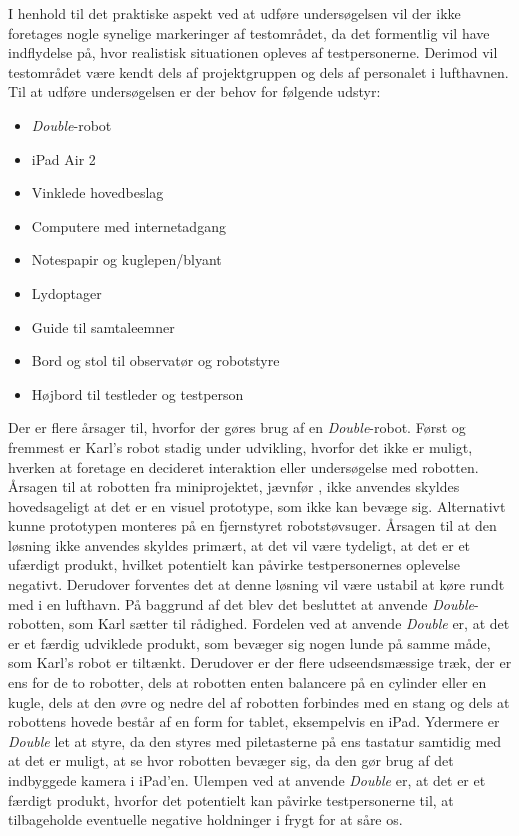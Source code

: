 I henhold til det praktiske aspekt ved at udføre undersøgelsen vil der ikke foretages nogle synelige markeringer af testområdet, da det formentlig vil have indflydelse på, hvor realistisk situationen opleves af testpersonerne. Derimod vil testområdet være kendt dels af projektgruppen og dels af personalet i lufthavnen. \blankline
%
Til at udføre undersøgelsen er der behov for følgende udstyr:\blankline
%
\begin{itemize}
  \item \textit{Double}-robot
  \item iPad Air 2
  \item Vinklede hovedbeslag
  \item Computere med internetadgang
  \item Notespapir og kuglepen/blyant
  \item Lydoptager
  \item Guide til samtaleemner
  \item Bord og stol til observatør og robotstyre
  \item Højbord til testleder og testperson\blankline
\end{itemize}
\noindent
%
Der er flere årsager til, hvorfor der gøres brug af en \textit{Double}-robot. Først og fremmest er Karl's robot stadig under udvikling, hvorfor det ikke er muligt, hverken at foretage en decideret interaktion eller undersøgelse med robotten. Årsagen til at robotten fra miniprojektet, jævnfør \fullref{\MiniprojektHovedeVinkelpartname}, ikke anvendes skyldes hovedsageligt at det er en visuel prototype, som ikke kan bevæge sig. Alternativt kunne prototypen monteres på en fjernstyret robotstøvsuger. Årsagen til at den løsning ikke anvendes skyldes primært, at det vil være tydeligt, at det er et ufærdigt produkt, hvilket potentielt kan påvirke testpersonernes oplevelse negativt. Derudover forventes det at denne løsning vil være ustabil at køre rundt med i en lufthavn. På baggrund af det blev det besluttet at anvende \textit{Double}-robotten, som Karl sætter til rådighed. Fordelen ved at anvende \textit{Double} er, at det er et færdig udviklede produkt, som bevæger sig nogen lunde på samme måde, som Karl's robot er tiltænkt. Derudover er der flere udseendsmæssige træk, der er ens for de to robotter, dels at robotten enten balancere på en cylinder eller en kugle, dels at den øvre og nedre del af robotten forbindes med en stang og dels at robottens hovede består af en form for tablet, eksempelvis en iPad. Ydermere er \textit{Double} let at styre, da den styres med piletasterne på ens tastatur samtidig med at det er muligt, at se hvor robotten bevæger sig, da den gør brug af det indbyggede kamera i iPad'en. Ulempen ved at anvende \textit{Double} er, at det er et færdigt produkt, hvorfor det potentielt kan påvirke testpersonerne til, at tilbageholde eventuelle negative holdninger i frygt for at såre os. 

